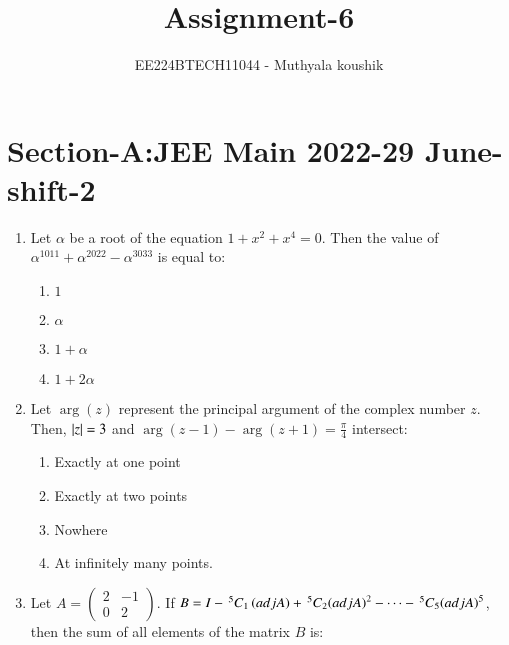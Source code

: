 \documentclass[journal,12pt,onecolumn]{IEEEtran}
\theoremstyle{remark}
\begin{document}

\vspace{3cm}

\title{Assignment-6}
\author{EE224BTECH11044 - Muthyala koushik
}
\maketitle
\bigskip

\renewcommand{\thefigure}{\theenumi}
\renewcommand{\thetable}{\theenumi}

\section{Section-A:JEE Main 2022-29 June-shift-2}
\begin{enumerate}[start=1]
	\item Let $\alpha$ be a root of the equation $1+x^2+x^4=0$. Then the value of ${\alpha}^{1011}+{\alpha}^{2022}-{\alpha}^{3033}$ is equal to:
		\begin{enumerate}
			\item $1$\\
			\item $\alpha$\\
			\item $1+\alpha$\\
			\item $1+2\alpha$\\
		\end{enumerate}
	\item Let $\arg(z)$ represent the principal argument of the complex number $z$. Then, $\left\vert z\right\vert=3$ and $\arg(z-1)-\arg(z+1)=\frac{\pi}{4}$ intersect:
		\begin{enumerate}
			\item Exactly at one point\\
			\item Exactly at two points\\
			\item Nowhere\\
			\item At infinitely many points.\\
		\end{enumerate}
	\item Let $A=\begin{pmatrix} 2 & -1 \\ 0 & 2 \end{pmatrix}$. If $B=I-\,^{5}C_{1}\left(adjA\right)+\,^{5}C_{2}{\left(adjA\right)}^2-\dots-\,^{5}C_{5}{\left(adjA\right)}^5$, then the sum of all elements of the matrix $B$ is:

\end{enumerate}
\end{document}
